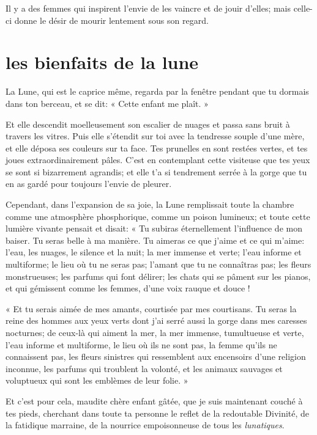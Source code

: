 Il y a des femmes qui inspirent l’envie de les vaincre
et de jouir d’elles; mais celle{}-ci donne le désir de
mourir lentement sous son regard.


\quebra\section[Les bienfaits de la lune]{les bienfaits de la lune }

La Lune, qui est le caprice même, regarda par la fenêtre pendant que tu
dormais dans ton berceau, et se dit: « Cette enfant me plaît. »

Et elle descendit moelleusement son escalier de nuages et passa sans
bruit à travers les vitres. Puis elle s’étendit sur
toi avec la tendresse souple d’une mère, et elle
déposa ses couleurs sur ta face. Tes prunelles en sont restées vertes,
et tes joues extraordinairement pâles. C’est en
contemplant cette visiteuse que tes yeux se sont si bizarrement
agrandis; et elle t’a si tendrement serrée à la gorge
que tu en as gardé pour toujours l’envie de pleurer.

Cependant, dans l’expansion de sa joie, la Lune
remplissait toute la chambre comme une atmosphère phosphorique, comme
un poison lumineux; et toute cette lumière vivante pensait et disait: «
Tu subiras éternellement l’influence de mon baiser. Tu
seras belle à ma manière. Tu aimeras ce que j’aime et
ce qui m’aime: l’eau, les nuages, le
silence et la nuit; la mer immense et verte; l’eau
informe et multiforme; le lieu où tu ne seras pas;
l’amant que tu ne connaîtras pas; les fleurs
monstrueuses; les parfums qui font délirer; les chats qui se pâment sur
les pianos, et qui gémissent comme les femmes, d’une
voix rauque et douce !

« Et tu serais aimée de mes amants, courtisée par mes courtisans. Tu
seras la reine des hommes aux yeux verts dont j’ai
serré aussi la gorge dans mes caresses nocturnes; de ceux{}-là qui
aiment la mer, la mer immense, tumultueuse et verte,
l’eau informe et multiforme, le lieu où ils ne sont
pas, la femme qu’ils ne connaissent pas, les fleurs
sinistres qui ressemblent aux encensoirs d’une
religion inconnue, les parfums qui troublent la volonté, et les animaux
sauvages et voluptueux qui sont les emblèmes de leur folie. »

Et c’est pour cela, maudite chère enfant gâtée, que je
suis maintenant couché à tes pieds, cherchant dans toute ta personne le
reflet de la redoutable Divinité, de la fatidique marraine, de la
nourrice empoisonneuse de tous les \textit{lunatiques}.

